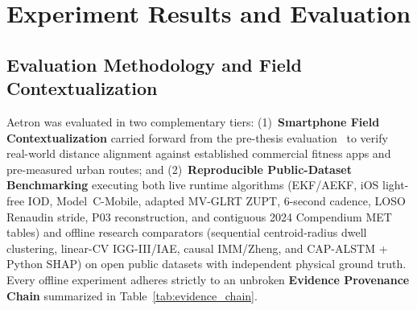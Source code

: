 \chapter{Experiment Results and Evaluation}
\label{ch:evaluation}

\section{Evaluation Methodology and Field Contextualization}
Aetron was evaluated in two complementary tiers: (1)~\textbf{Smartphone Field Contextualization} carried forward from the pre-thesis evaluation~\cite{aetron2026prethesis} to verify real-world distance alignment against established commercial fitness apps and pre-measured urban routes; and (2)~\textbf{Reproducible Public-Dataset Benchmarking} executing both live runtime algorithms (EKF/AEKF, iOS light-free IOD, Model~C-Mobile, adapted MV-GLRT ZUPT, 6-second cadence, LOSO Renaudin stride, P03 reconstruction, and contiguous 2024 Compendium MET tables) and offline research comparators (sequential centroid-radius dwell clustering, linear-CV IGG-III/IAE, causal IMM/Zheng, and CAP-ALSTM + Python SHAP) on open public datasets with independent physical ground truth. Every offline experiment adheres strictly to an unbroken \textbf{Evidence Provenance Chain} summarized in Table~\ref{tab:evidence_chain}.

